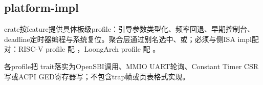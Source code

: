
\subsection{platform-impl}

 crate按feature提供具体板级profile：引导参数类型化、频率回退、早期控制台、deadline定时器编程与系统复位。聚合层通过别名选中、或；必须与侧ISA impl配对：RISC-V profile 配 ，LoongArch profile 配 。

各profile把 trait落实为OpenSBI调用、MMIO UART轮询、Constant Timer CSR写或ACPI GED寄存器写；不包含trap帧或页表格式实现。





